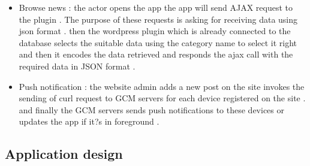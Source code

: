 \begin{itemize}
\begin{itemize}
\item  Browse news : the actor opens the app the app will send AJAX request to the plugin . The purpose of these requests is asking for receiving data using json format . then the wordpress plugin which is already connected to the database selects the suitable data using the category name to select it right and then it encodes the data retrieved and responds the ajax call with the required data in JSON format .
\item Push notification : the website admin adds a new post on the site invokes the sending of curl request to GCM servers for each device registered on the site . and finally the GCM servers sends push notifications to these devices or updates the app if it?s in foreground .
\end{itemize}

\end{itemize}

\subsection{Application design}
